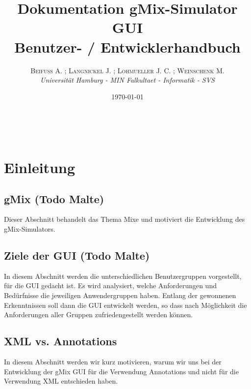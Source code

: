 \documentclass[a4paper, 11pt]{article} %
\title{\textbf{Dokumentation gMix-Simulator GUI}\\ %
Benutzer- / Entwicklerhandbuch} %
\author{\textsc{Beifuß A. ; Langnickel J. ; Lohmueller J. C. ; Weinschenk M.} %
\\{\textit{Universität Hamburg - MIN Falkultaet - Informatik - SVS}}} %
\date{\today} %
\makeatletter
\renewcommand{\maketitle}{ %
\begin{flushright} %
{\LARGE\@title} %

\vspace{50pt} %

{\large\@author} %
\\\@date %

\vspace{40pt} %
\end{flushright}
}
\makeatother
\begin{document}
\maketitle %

 


\tableofcontents


\vspace{30pt} %

\section{Einleitung} %
\label{sec:einleitung}

\subsection{gMix (Todo Malte)} %
\label{sub:gmix}
Dieser Abschnitt behandelt das Thema Mixe und motiviert die Entwicklung des gMix-Simulators.

\subsection{Ziele der GUI (Todo Malte)} %
\label{sub:ziele_der_gui}
In diesem Abschnitt werden die unterschiedlichen Benutzergruppen vorgestellt, für die GUI gedacht ist. Es wird analysiert, welche Anforderungen und Bedürfnisse die jeweiligen Anwendergruppen haben. Entlang der gewonnenen Erkenntnissen soll dann die GUI entwickelt werden, so dass nach Möglichkeit die Anforderungen aller Gruppen zufriedengestellt werden können.

\subsection{XML vs. Annotations} %
\label{sub:xml}
In diesem Abschnitt werden wir kurz motivieren, warum wir uns bei der Entwicklung der gMix GUI für die Verwendung Annotations und nicht für die Verwendung XML entschieden haben.\\
\end{document}

